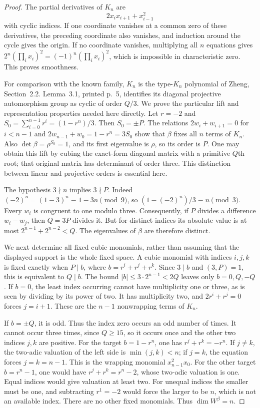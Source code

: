 \begin{proof}
The partial derivatives of $K_n$ are
\[
                 2x_i x_{i+1}+x_{i-1}^2
\]
with cyclic indices. If one coordinate vanishes at a common
zero of these derivatives, the preceding coordinate also
vanishes, and induction around the cycle gives the origin.
If no coordinate vanishes, multiplying all $n$ equations gives
$2^n(\prod_i x_i)^2=(-1)^n(\prod_i x_i)^2$, which is impossible
in characteristic zero. This proves smoothness.

For comparison with the known family, $K_n$ is the type-$K_n$
polynomial of Zheng, Section~2.2. Lemma~3.1, printed p.~5,
identifies its diagonal projective automorphism group as
cyclic of order $Q/3$. We prove the particular lift and
representation properties needed here directly.
Let $r=-2$ and $S_0=\sum_{i=0}^{n-1}r^i=(1-r^n)/3$.
Then $S_0=\pm P$. The relations
$2w_i+w_{i+1}=0$ for $i<n-1$ and
$2w_{n-1}+w_0=1-r^n=3S_0$ show that $\beta$ fixes
all $n$ terms of $K_n$. Also
$\det\beta=\rho^{S_0}=1$, and its first eigenvalue is $\rho$,
so its order is $P$.
One may obtain this lift by cubing the exact-form diagonal
matrix with a primitive $Q$th root; that original matrix has
determinant of order three. This distinction between linear
and projective orders is essential here.

The hypothesis $3\nmid n$ implies $3\nmid P$. Indeed
$(-2)^n=(1-3)^n\equiv1-3n\pmod9$, so
$(1-(-2)^n)/3\equiv n\pmod3$.
Every $w_i$ is congruent to one modulo three.
Consequently, if $P$ divides a difference $w_i-w_j$, then
$Q=3P$ divides it. But for distinct indices its absolute
value is at most $2^{n-1}+2^{n-2}<Q$.
The eigenvalues of $\beta$ are therefore distinct.

We next determine all fixed cubic monomials, rather than
assuming that the displayed support is the whole fixed space.
A cubic monomial with indices $i,j,k$ is fixed exactly when
$P\mid b$, where $b=r^i+r^j+r^k$. Since $3\mid b$ and
$(3,P)=1$, this is equivalent to $Q\mid b$.
The bound $|b|\le3\cdot2^{n-1}<2Q$ leaves only
$b=0,Q,-Q$.
If $b=0$, the least index occurring cannot have multiplicity
one or three, as is seen by dividing by its power of two.
It has multiplicity two, and
$2r^i+r^j=0$ forces $j=i+1$.
These are the $n-1$ nonwrapping terms of $K_n$.

If $b=\pm Q$, it is odd. Thus the index zero occurs an odd
number of times. It cannot occur three times, since
$Q\ge15$, so it occurs once and the other two indices
$j,k$ are positive. For the target $b=1-r^n$, one has
$r^j+r^k=-r^n$. If $j\ne k$, the two-adic valuation of
the left side is $\min(j,k)<n$; if $j=k$, the equation
forces $j=k=n-1$. This is the wrapping monomial
$x_{n-1}^2x_0$. For the other target $b=r^n-1$,
one would have $r^j+r^k=r^n-2$, whose two-adic valuation
is one. Equal indices would give valuation at least two.
For unequal indices the smaller must be one, and subtracting
$r^1=-2$ would force the larger to be $n$, which is not
an available index. There are no other fixed monomials.
Thus $\dim W^\beta=n$.


\end{proof}
